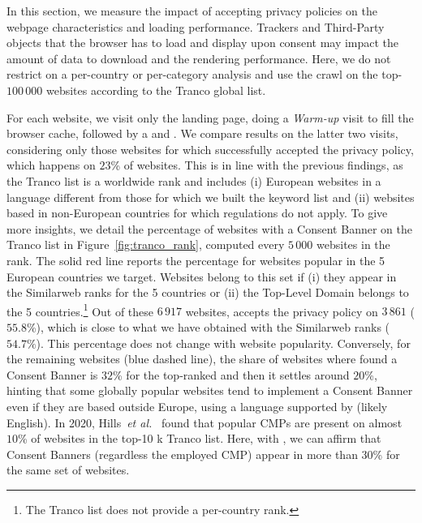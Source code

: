 In this section, we measure the impact of accepting privacy policies on the webpage characteristics and loading performance. Trackers and Third-Party objects that the browser has to load and display upon consent may impact the amount of data to download and the rendering performance. Here, we do not restrict on a per-country or per-category analysis and use the crawl on the top-$100\,000$ websites according to the Tranco global list. 

For each website, we visit only the landing page, doing a \emph{Warm-up} visit to fill the browser cache, followed by a \BEFORE and \AFTER. We compare results on the latter two visits, considering only those websites for which \TOOL successfully accepted the privacy policy, which happens on $23$\% of websites. This is in line with the previous findings, as the Tranco list is a worldwide rank and includes (i) European websites in a language different from those for which we built the keyword list and (ii) websites based in non-European countries for which regulations do not apply. To give more insights, we detail the percentage of websites with a Consent Banner on the Tranco list in Figure~\ref{fig:tranco_rank}, computed every $5\,000$ websites in the rank. The solid red line reports the percentage for websites popular in the 5 European countries we target. Websites belong to this set if (i) they appear in the Similarweb ranks for the 5 countries or (ii) the Top-Level Domain belongs to the 5 countries.\footnote{The Tranco list does not provide a per-country rank.} Out of these $6\,917$ websites, \TOOL accepts the privacy policy on $3\,861$ ($55.8$\%), which is close to what we have obtained with the Similarweb ranks ($54.7\%$). This percentage does not change with website popularity. Conversely, for the remaining websites (blue dashed line), the share of websites where \TOOL found a Consent Banner is $32$\% for the top-ranked and then it settles around $20$\%, hinting that some globally popular websites tend to implement a Consent Banner even if they are based outside Europe, using a language supported by \TOOL (likely English). In 2020, Hills~\emph{et al.}~\cite{hills2020consent} found that popular CMPs are present on almost $10$\% of websites in the top-10 k Tranco list. Here, with \TOOL, we can affirm that Consent Banners (regardless the employed CMP) appear in more than $30$\% for the same set of websites.


